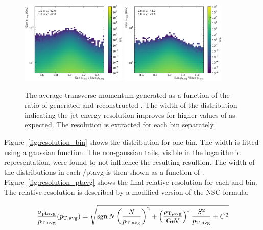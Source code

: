 \begin{figure}[htbp]
    \includegraphics[width=0.45\textwidth]{figures/measurement/gen_vs_reco_vs_gen_ptavg_yb1ys1.pdf}\hfill
    \includegraphics[width=0.45\textwidth]{figures/measurement/gen_vs_reco_vs_gen_ptavg_yb2ys0.pdf}
    \caption[Comparison generated vs. reconstructed transverse energy]{The
    average transverse momentum generated as a function of the ratio of
generated and reconstructed \ptavg. The width of the distribution indicating the
jet energy resolution improves for higher values of \ptavg as expected. The
resolution is extracted for each bin separately.}
    \label{fig:gen_vs_reco_over_gen}
\end{figure}

Figure~\ref{fig:resolution_bin} shows the distribution for one \ptavg bin. The
width is fitted using a gaussian function. The non-gaussian tails, visible in
the logarithmic representation, were found to not influence the resulting
resultion. The width of the distributions in each /ptavg is then shown as a
function of \ptavg. Figure~\ref{fig:resolution_ptavg} shows the final relative
resolution for each \ystar and \yboost bin. The relative resolution is described
by a modified version of the NSC formula.

\begin{equation}
    \frac{\sigma_{\text{ptavg}}}{p_{\mathrm{T,avg}}} (p_{\mathrm{T,avg}}) = \sqrt{\operatorname{sgn}{N} \left(\frac{N}{p_{\mathrm{T,avg}}}\right)^2 + \left(\frac{p_{\mathrm{T,avg}}}{\text{GeV}}\right)^s \frac{S^2}{p_{\mathrm{T,avg}}} + C^2 }
    \label{eq:resolution}
\end{equation}

